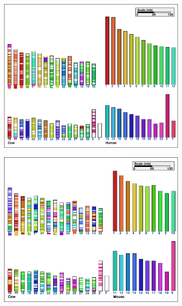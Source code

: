 \begin{figure}[!h]
\centering
\begin{subfigure}[b]{0.15\textwidth}
\includegraphics[width=\textwidth]{imag/graph3_cow_humain1}
\end{subfigure}
\begin{subfigure}[b]{0.15\textwidth}
\includegraphics[width=\textwidth]{imag/graph3_cow_mouse1}
\end{subfigure}
\begin{subfigure}[b]{0.13\textwidth}

\end{subfigure}
\end{figure}
